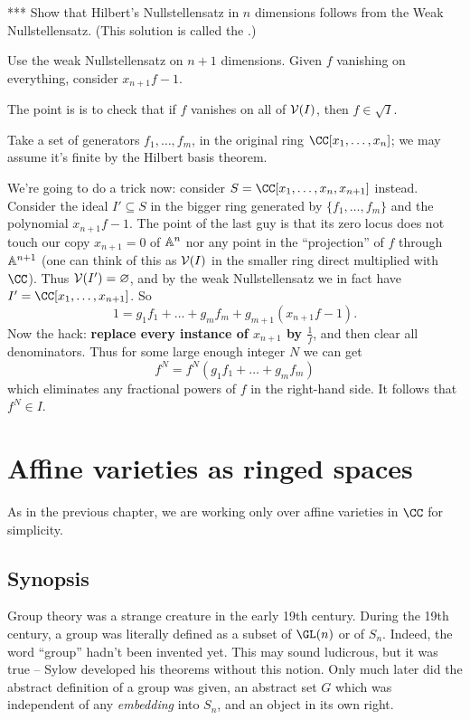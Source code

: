 \documentclass[11pt]{scrreprt}
\renewcommand{\kurumi}{***}
\begin{document}
\begin{problem}
	\kurumi
	Show that Hilbert's Nullstellensatz in $n$ dimensions
	follows from the Weak Nullstellensatz.
	(This solution is called the .)
	\begin{hint}
		Use the weak Nullstellensatz on $n+1$ dimensions.
		Given $f$ vanishing on everything,
		consider $x_{n+1}f-1$. 
	\end{hint}
	\begin{sol}
		The point is is to check that if $f$ vanishes on all of $\mathcal V(I)$,
		then $f \in \sqrt I$.

		Take a set of generators $f_1, \dots, f_m$,
		in the original ring $\CC[x_1, \dots, x_n]$;
		we may assume it's finite by the Hilbert basis theorem.

		We're going to do a trick now:
		consider $S = \CC[x_1, \dots, x_n, x_{n+1}]$ instead.
		Consider the ideal $I' \subseteq S$ in the bigger ring
		generated by $\{f_1, \dots, f_m\}$ and the polynomial $x_{n+1} f - 1$.
		The point of the last guy is that its zero locus
		does not touch our copy $x_{n+1}=0$ of $\mathbb A^n$
		nor any point in the ``projection'' of $f$ through $\mathbb A^{n+1}$
		(one can think of this as $\mathcal V(I)$ in the smaller ring
		direct multiplied with $\CC$).
		Thus $\mathcal V(I') = \varnothing$, and by the weak Nullstellensatz
		we in fact have $I' = \CC[x_1, \dots, x_{n+1}]$.
		So
		\[ 1 = g_1f_1 + \dots + g_mf_m + g_{m+1} \left( x_{n+1}f-1 \right). \]
		Now the hack: \textbf{replace every instance of $x_{n+1}$ by $\frac 1f$},
		and then clear all denominators.
		Thus for some large enough integer $N$ we can get
		\[ f^N = f^N(g_1f_1 + \dots + g_mf_m) \]
		which eliminates any fractional powers of $f$ in the right-hand side.
		It follows that $f^N \in I$.
	\end{sol}
\end{problem}


\chapter{Affine varieties as ringed spaces}
As in the previous chapter, we are working only over affine varieties in $\CC$ for simplicity.

\section{Synopsis}
Group theory was a strange creature in the early 19th century.
During the 19th century, a group was literally defined
as a subset of $\GL(n)$ or of $S_n$.
Indeed, the word ``group'' hadn't been invented yet.
This may sound ludicrous, but it was true -- Sylow developed his theorems without this notion.
Only much later did the abstract definition of a group was given,
an abstract set $G$ which was independent of any \emph{embedding} into $S_n$,
and an object in its own right.
\end{document}
